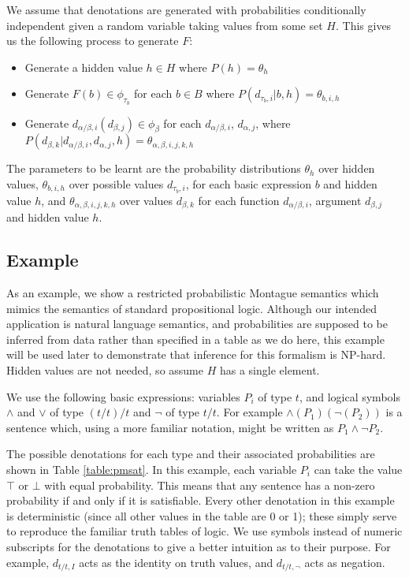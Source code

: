 \documentclass[manuscript]{clv2}
\newcommand{\interp}[1]{[\![ #1 ]\!]}
\begin{document}
We assume that denotations are generated with probabilities
conditionally independent given a random variable taking values from
some set $H$. This gives us the following process to generate $F$:
\begin{itemize}
\item Generate a hidden value $h\in H$ where $P(h) = \theta_h$
\item Generate $F(b) \in \phi_{\tau_b}$ for each $b\in B$ where
  $P(d_{\tau_b,i}|b, h) = \theta_{b,i,h}$
\item Generate $d_{\alpha/\beta,i}(d_{\beta,j}) \in \phi_\beta$ for each $d_{\alpha/\beta,i}$, $d_{\alpha,j}$,
where $P(d_{\beta,k}|d_{\alpha/\beta,i}, d_{\alpha,j},h) = \theta_{\alpha,\beta,i,j,k,h}$
\end{itemize}
The parameters to be learnt are the probability distributions
$\theta_h$ over hidden values, $\theta_{b,i,h}$ over possible values
$d_{\tau_b,i}$, for each basic expression $b$ and hidden value $h$,
and $\theta_{\alpha,\beta,i,j,k,h}$ over values $d_{\beta,k}$ for each
function $d_{\alpha/\beta,i}$, argument $d_{\beta,j}$ and hidden
value $h$.

\subsection{Example}

As an example, we show a restricted probabilistic Montague semantics
which mimics the semantics of standard propositional logic. Although
our intended application is natural language semantics, and
probabilities are supposed to be inferred from data rather than
specified in a table as we do here, this example will be used later to
demonstrate that inference for this formalism is NP-hard. Hidden
values are not needed, so assume $H$ has a single element.

We use the following basic expressions: variables $P_i$ of type $t$,
and logical symbols $\land$ and $\lor$ of type $(t/t)/t$ and $\lnot$
of type $t/t$. For example $\land (P_1)(\lnot (P_2))$ is a sentence
which, using a more familiar notation, might be written as $P_1 \land
\lnot P_2$.

The possible denotations for each type and their associated
probabilities are shown in Table \ref{table:pmsat}. In this example,
each variable $P_i$ can take the value $\top$ or $\bot$ with equal
probability. This means that any sentence has a non-zero probability
if and only if it is satisfiable. Every other denotation in this
example is deterministic (since all other values in the table are 0 or
1); these simply serve to reproduce the familiar truth tables of
logic. We use symbols instead of numeric subscripts for the
denotations to give a better intuition as to their purpose. For
example, $d_{t/t,I}$ acts as the identity on truth values, and
$d_{t/t,\lnot}$ acts as negation.
\end{document}

